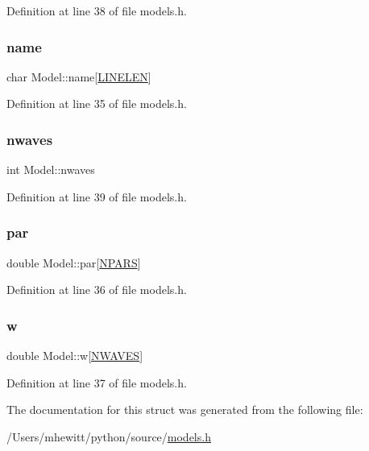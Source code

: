 Definition at line 38 of file models.\+h.

\mbox{\label{struct_model_ae1a912821e971507d741235b3ed9a53b}} 
\subsubsection{\texorpdfstring{name}{name}}
{\footnotesize\ttfamily char Model\+::name\mbox{[}\hyperlink{wind__updates2d_8c_a764eaf37b6117ac7a17b1c049c1d2d16}{L\+I\+N\+E\+L\+EN}\mbox{]}}



Definition at line 35 of file models.\+h.

\mbox{\label{struct_model_a1342a65367462309cd78b4e8501676d5}} 
\subsubsection{\texorpdfstring{nwaves}{nwaves}}
{\footnotesize\ttfamily int Model\+::nwaves}



Definition at line 39 of file models.\+h.

\mbox{\label{struct_model_a4965d57176e865b9327da14bdc2fe1d4}} 
\subsubsection{\texorpdfstring{par}{par}}
{\footnotesize\ttfamily double Model\+::par\mbox{[}\hyperlink{models_8h_a4a80e098a43386a893ebc656b14e636c}{N\+P\+A\+RS}\mbox{]}}



Definition at line 36 of file models.\+h.

\mbox{\label{struct_model_aaba6c185c8096c923ffdbb3dcfdc3864}} 
\subsubsection{\texorpdfstring{w}{w}}
{\footnotesize\ttfamily double Model\+::w\mbox{[}\hyperlink{models_8h_a95cbba9bb03693d847a93cffbbf015e4}{N\+W\+A\+V\+ES}\mbox{]}}



Definition at line 37 of file models.\+h.



The documentation for this struct was generated from the following file\+:\begin{DoxyCompactItemize}
\item 
/\+Users/mhewitt/python/source/\hyperlink{models_8h}{models.\+h}\end{DoxyCompactItemize}
